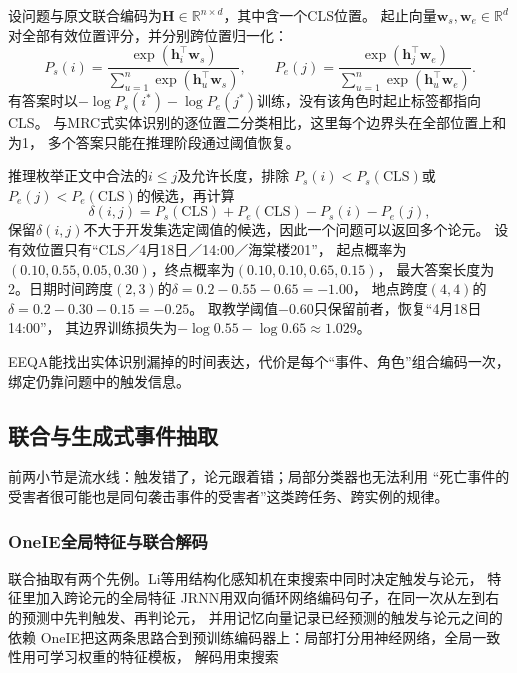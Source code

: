 设问题与原文联合编码为$\bm{H}\in\mathbb{R}^{n\times d}$，其中含一个CLS位置。
起止向量$\bm{w}_s,\bm{w}_e\in\mathbb{R}^{d}$对全部有效位置评分，并分别跨位置归一化：
\begin{equation}
  P_s(i)=\frac{\exp(\bm{h}_i^\top\bm{w}_s)}
               {\sum_{u=1}^{n}\exp(\bm{h}_u^\top\bm{w}_s)},
  \qquad
  P_e(j)=\frac{\exp(\bm{h}_j^\top\bm{w}_e)}
               {\sum_{u=1}^{n}\exp(\bm{h}_u^\top\bm{w}_e)}.
  \label{eq:nlp-extraction-eeqa}
\end{equation}
有答案时以$-\log P_s(i^*)-\log P_e(j^*)$训练，没有该角色时起止标签都指向CLS。
与MRC式实体识别的逐位置二分类相比，这里每个边界头在全部位置上和为1，
多个答案只能在推理阶段通过阈值恢复。

推理枚举正文中合法的$i\leq j$及允许长度，排除
$P_s(i)<P_s(\mathrm{CLS})$或$P_e(j)<P_e(\mathrm{CLS})$的候选，再计算
\begin{equation}
  \delta(i,j)=P_s(\mathrm{CLS})+P_e(\mathrm{CLS})-P_s(i)-P_e(j),
  \label{eq:nlp-extraction-eeqa-threshold}
\end{equation}
保留$\delta(i,j)$不大于开发集选定阈值的候选，因此一个问题可以返回多个论元。
设有效位置只有“CLS／4月18日／14:00／海棠楼201”，
起点概率为$(0.10,0.55,0.05,0.30)$，终点概率为$(0.10,0.10,0.65,0.15)$，
最大答案长度为2。日期时间跨度$(2,3)$的$\delta=0.2-0.55-0.65=-1.00$，
地点跨度$(4,4)$的$\delta=0.2-0.30-0.15=-0.25$。
取教学阈值$-0.60$只保留前者，恢复“4月18日14:00”，
其边界训练损失为$-\log0.55-\log0.65\approx1.029$。

EEQA能找出实体识别漏掉的时间表达，代价是每个“事件、角色”组合编码一次，
绑定仍靠问题中的触发信息。

\subsection{联合与生成式事件抽取}
\label{sec:nlp-extraction-joint-generative}

前两小节是流水线：触发错了，论元跟着错；局部分类器也无法利用
“死亡事件的受害者很可能也是同句袭击事件的受害者”这类跨任务、跨实例的规律。

\subsubsection{OneIE全局特征与联合解码}
\label{sec:nlp-extraction-oneie}

联合抽取有两个先例。Li等用结构化感知机在束搜索中同时决定触发与论元，
特征里加入跨论元的全局特征
JRNN用双向循环网络编码句子，在同一次从左到右的预测中先判触发、再判论元，
并用记忆向量记录已经预测的触发与论元之间的依赖
OneIE把这两条思路合到预训练编码器上：局部打分用神经网络，全局一致性用可学习权重的特征模板，
解码用束搜索


